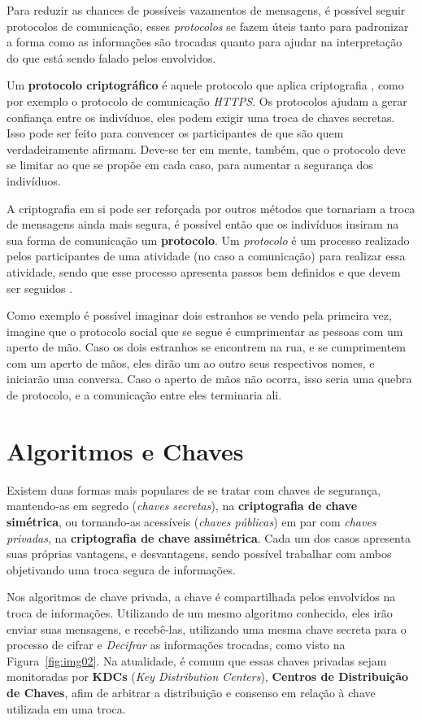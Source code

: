 	Para reduzir as chances de possíveis vazamentos de mensagens, é possível seguir protocolos de comunicação, esses \textit{protocolos} se fazem úteis tanto para padronizar a forma como as informações são trocadas quanto para ajudar na interpretação do que está sendo falado pelos envolvidos.
	
	Um \textbf{protocolo criptográfico} é aquele protocolo que aplica criptografia \cite[p.~31]{schneier96}, como por exemplo o protocolo de comunicação \textit{HTTPS}. Os protocolos ajudam a gerar confiança entre os indivíduos, eles podem exigir uma troca de chaves secretas. Isso pode ser feito para convencer os participantes de que são quem verdadeiramente afirmam. Deve-se ter em mente, também, que o protocolo deve se limitar ao que se propõe em cada caso, para aumentar a segurança dos indivíduos.

	A criptografia em si pode ser reforçada por outros métodos que tornariam a troca de mensagens ainda mais segura, é possível então que os indivíduos insiram na sua forma de comunicação um \textbf{protocolo}. Um \textit{protocolo} é um processo realizado pelos participantes de uma atividade (no caso a comunicação) para realizar essa atividade, sendo que esse processo apresenta passos bem definidos e que devem ser seguidos \cite{schneier96}.
	
	Como exemplo é possível imaginar dois estranhos se vendo pela primeira vez, imagine que o protocolo social que se segue é cumprimentar as pessoas com um aperto de mão. Caso os dois estranhos se encontrem na rua, e se cumprimentem com um aperto de mãos, eles dirão um ao outro seus respectivos nomes, e iniciarão uma conversa. Caso o aperto de mãos não ocorra, isso seria uma quebra de protocolo, e a comunicação entre eles terminaria ali.

\section[Algoritmos e Chaves]{Algoritmos e Chaves}

	Existem duas formas mais populares de se tratar com chaves de segurança, mantendo-as em segredo (\textit{chaves secretas}), na \textbf{criptografia de chave simétrica}, ou tornando-as acessíveis (\textit{chaves públicas}) em par com \textit{chaves privadas}, na \textbf{criptografia de chave assimétrica}. Cada um dos casos apresenta suas próprias vantagens, e desvantagens, sendo possível trabalhar com ambos objetivando uma troca segura de informações.
	
	Nos algoritmos de chave privada, a chave é compartilhada pelos envolvidos na troca de informações. Utilizando de um mesmo algoritmo conhecido, eles irão enviar suas mensagens, e recebê-las, utilizando uma mesma chave secreta para o processo de cifrar e \textit{Decifrar} as informações trocadas, como visto na Figura~\ref{fig:img02}. Na atualidade, é comum que essas chaves privadas sejam monitoradas por \textbf{KDCs} (\textit{Key Distribution Centers}), \textbf{Centros de Distribuição de Chaves}, afim de arbitrar a distribuição e consenso em relação à chave utilizada em uma troca.

